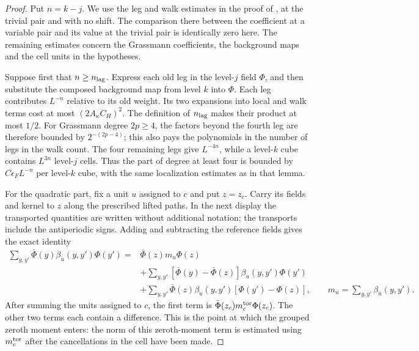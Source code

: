 \documentclass[11pt,letterpaper,reqno]{amsart}
\theoremstyle{definition}
\theoremstyle{remark}
\begin{document}
\begin{proof}Put $n=k-j$.  We use the leg and walk estimates in the proof of
\cite[Lem. 7.9]{QCDM1}, at the trivial pair and with no shift.
The comparison there between the coefficient at a variable pair
and its value at the trivial pair is identically zero here.
The remaining estimates concern the Grassmann coefficients,
the background maps and the cell units in the hypotheses.

Suppose first that $n\ge n_{\rm lag}$.  Express each old leg in
the level-$j$ field $\Phi$, and then substitute the composed
background map from level $k$ into $\Phi$.  Each leg contributes
$L^{-n}$ relative to its old weight.  Its two expansions into
local and walk terms cost at most $(2A_\kappa C_H)^2$.
The definition of $n_{\rm lag}$ makes their product at most
$1/2$.  For Grassmann degree $2p\ge4$, the factors beyond
the fourth leg are therefore bounded by $2^{-(2p-4)}$;
this also pays the polynomials in the number of legs in the
walk count.  The four remaining legs give $L^{-4n}$,
while a level-$k$ cube contains $L^{3n}$ level-$j$ cells.
Thus the part of degree at least four is bounded by
$C\epsilon_FL^{-n}$ per level-$k$ cube, with the same
localization estimates as in that lemma.

For the quadratic part, fix a unit $u$ assigned to $c$ and
put $z=z_c$.  Carry its fields and kernel to $z$ along the
prescribed lifted paths.  In the next display the transported
quantities are written without additional notation; the
transports include the antiperiodic signs.  Adding and
subtracting the reference fields gives the exact identity
\begin{align*}
 \sum_{y,y'}\bar\Phi(y)\beta_u(y,y')\Phi(y')
 ={}&\bar\Phi(z)m_u\Phi(z)\\
 &+\sum_{y,y'}[\bar\Phi(y)-\bar\Phi(z)]
                       \beta_u(y,y')\Phi(y')\\
 &+\sum_{y,y'}\bar\Phi(z)\beta_u(y,y')
                              [\Phi(y')-\Phi(z)],
 \qquad m_u=\sum_{y,y'}\beta_u(y,y').
\end{align*}
After summing the units assigned to $c$, the first term is
$\bar\Phi(z_c)m_c^{\rm tor}\Phi(z_c)$.  The other two
terms each contain a difference.  This is the point at
which the grouped zeroth moment enters: the norm of this
zeroth-moment term is estimated using $m_c^{\rm tor}$ after
the cancellations in the cell have been made.


\end{proof}
\end{document}
